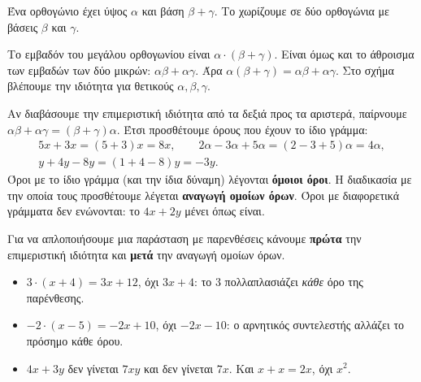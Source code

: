 Ένα ορθογώνιο έχει ύψος $\alpha$ και βάση $\beta+\gamma$. Το χωρίζουμε σε δύο ορθογώνια με βάσεις $\beta$ και $\gamma$.
\begin{center}
\end{center}
Το εμβαδόν του μεγάλου ορθογωνίου είναι $\alpha\cdot(\beta+\gamma)$. Είναι όμως και το άθροισμα των εμβαδών των δύο μικρών: $\alpha\beta+\alpha\gamma$. Άρα $\alpha(\beta+\gamma)=\alpha\beta+\alpha\gamma$. Στο σχήμα βλέπουμε την ιδιότητα για θετικούς $\alpha,\beta,\gamma$.


Αν διαβάσουμε την επιμεριστική ιδιότητα από τα δεξιά προς τα αριστερά, παίρνουμε $\alpha\beta+\alpha\gamma=(\beta+\gamma)\alpha$. Έτσι προσθέτουμε όρους που έχουν το ίδιο γράμμα:
\begin{gather*}
5x+3x=(5+3)x=8x,\qquad 2\alpha-3\alpha+5\alpha=(2-3+5)\alpha=4\alpha,\\
y+4y-8y=(1+4-8)y=-3y.
\end{gather*}
Όροι με το ίδιο γράμμα (και την ίδια δύναμη) λέγονται \textbf{όμοιοι όροι}. Η διαδικασία με την οποία τους προσθέτουμε λέγεται \textbf{αναγωγή ομοίων όρων}. Όροι με διαφορετικά γράμματα δεν ενώνονται: το $4x+2y$ μένει όπως είναι.

Για να απλοποιήσουμε μια παράσταση με παρενθέσεις κάνουμε \textbf{πρώτα} την επιμεριστική ιδιότητα και \textbf{μετά} την αναγωγή ομοίων όρων.

\begin{prosoxi}
\begin{itemize}[leftmargin=1.2em,itemsep=0.3ex,topsep=2pt]
\item $3\cdot(x+4)=3x+12$, όχι $3x+4$: το $3$ πολλαπλασιάζει \emph{κάθε} όρο της παρένθεσης.
\item $-2\cdot(x-5)=-2x+10$, όχι $-2x-10$: ο αρνητικός συντελεστής αλλάζει το πρόσημο κάθε όρου.
\item $4x+3y$ δεν γίνεται $7xy$ και δεν γίνεται $7x$. Και $x+x=2x$, όχι $x^2$.
\end{itemize}
\end{prosoxi}

